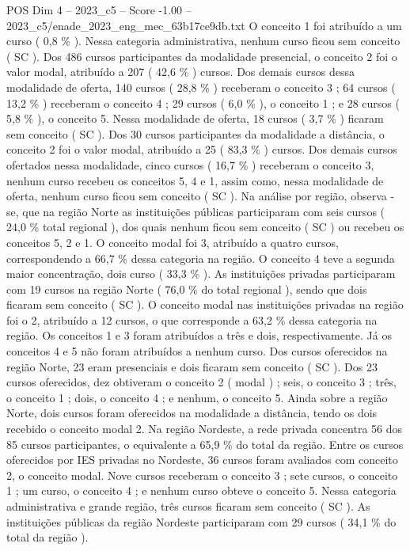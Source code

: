 \begin{textsample}{POS Dim 4 – 2023\_c5 – Score -1.00 – 2023\_c5/enade\_2023\_eng\_mec\_63b17ce9db.txt}
O conceito 1 foi atribuído a um curso ( 0,8 \% ).
Nessa categoria administrativa, nenhum curso ficou sem conceito ( SC ).
Dos 486 cursos participantes da modalidade presencial, o conceito 2 foi o valor modal, atribuído a 207 ( 42,6 \% ) cursos.
Dos demais cursos dessa modalidade de oferta, 140 cursos ( 28,8 \% ) receberam o conceito 3 ; 64 cursos ( 13,2 \% ) receberam o conceito 4 ; 29 cursos ( 6,0 \% ), o conceito 1 ; e 28 cursos ( 5,8 \% ), o conceito 5.
Nessa modalidade de oferta, 18 cursos ( 3,7 \% ) ficaram sem conceito ( SC ).
Dos 30 cursos participantes da modalidade a distância, o conceito 2 foi o valor modal, atribuído a 25 ( 83,3 \% ) cursos.
Dos demais cursos ofertados nessa modalidade, cinco cursos ( 16,7 \% ) receberam o conceito 3, nenhum curso recebeu os conceitos 5, 4 e 1, assim como, nessa modalidade de oferta, nenhum curso ficou sem conceito ( SC ).
Na análise por região, observa -se, que na região Norte as instituições públicas participaram com seis cursos ( 24,0 \% total regional ), dos quais nenhum ficou sem conceito ( SC ) ou recebeu os conceitos 5, 2 e 1.
O conceito modal foi 3, atribuído a quatro cursos, correspondendo a 66,7 \% dessa categoria na região.
O conceito 4 teve a segunda maior concentração, dois curso ( 33,3 \% ).
As instituições privadas participaram com 19 cursos na região Norte ( 76,0 \% do total regional ), sendo que dois ficaram sem conceito ( SC ).
O conceito modal nas instituições privadas na região foi o 2, atribuído a 12 cursos, o que corresponde a 63,2 \% dessa categoria na região.
Os conceitos 1 e 3 foram atribuídos a três e dois, respectivamente.
Já os conceitos 4 e 5 não foram atribuídos a nenhum curso.
Dos cursos oferecidos na região Norte, 23 eram presenciais e dois ficaram sem conceito ( SC ).
Dos 23 cursos oferecidos, dez obtiveram o conceito 2 ( modal ) ; seis, o conceito 3 ; três, o conceito 1 ; dois, o conceito 4 ; e nenhum, o conceito 5.
Ainda sobre a região Norte, dois cursos foram oferecidos na modalidade a distância, tendo os dois recebido o conceito modal 2.
Na região Nordeste, a rede privada concentra 56 dos 85 cursos participantes, o equivalente a 65,9 \% do total da região.
Entre os cursos oferecidos por IES privadas no Nordeste, 36 cursos foram avaliados com conceito 2, o conceito modal.
Nove cursos receberam o conceito 3 ; sete cursos, o conceito 1 ; um curso, o conceito 4 ; e nenhum curso obteve o conceito 5.
Nessa categoria administrativa e grande região, três cursos ficaram sem conceito ( SC ).
As instituições públicas da região Nordeste participaram com 29 cursos ( 34,1 \% do total da região ).

\end{textsample}
